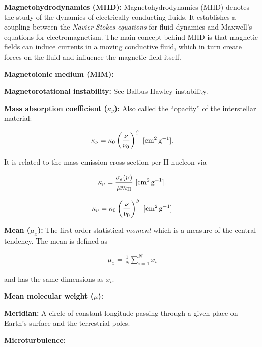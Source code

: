 \documentclass[a4paper,10pt]{article}
\begin{document}
{\noindent}\textbf{Magnetohydrodynamics (MHD):} Magnetohydrodynamics (MHD) denotes the study of the dynamics of electrically conducting fluids. It establishes a coupling between the \textit{Navier-Stokes equations} for fluid dynamics and Maxwell's equations for electromagnetism. The main concept behind MHD is that magnetic fields can induce currents in a moving conductive fluid, which in turn create forces on the fluid and influence the magnetic field itself. 

{\noindent}\textbf{Magnetoionic medium (MIM):}

{\noindent}\textbf{Magnetorotational instability:} See Balbus-Hawley instability.

{\noindent}\textbf{Mass absorption coefficient ($\kappa_\nu$):} Also called the ``opacity'' of the interstellar material:

\begin{align*}
    \kappa_\nu = \kappa_0 \left(\frac{\nu}{\nu_0}\right)^\beta ~ [{\rm cm^2\,g^{-1}}].
\end{align*}

{\noindent}It is related to the mass emission cross section per H nucleon via

\begin{align*}
    \kappa_\nu = \frac{\sigma_e(\nu)}{\mu m_{\rm H}} ~ [{\rm cm^2\,g^{-1}}].
\end{align*}

\begin{align*}
    \kappa_\nu = \kappa_0 \left(\frac{\nu}{\nu_0}\right)^\beta ~ [{\rm cm^2\,g^{-1}}]
\end{align*}

{\noindent}\textbf{Mean ($\mu_x$):} The first order statistical \textit{moment} which is a measure of the central tendency. The mean is defined as

\begin{align*}
    \mu_x = \frac{1}{N} \sum_{i=1}^N x_i
\end{align*}

{\noindent}and has the same dimensions as $x_i$.

{\noindent}\textbf{Mean molecular weight ($\mu$):}

{\noindent}\textbf{Meridian:} A circle of constant longitude passing through a given place on Earth's surface and the terrestrial poles.

{\noindent}\textbf{Microturbulence:}
\end{document}

